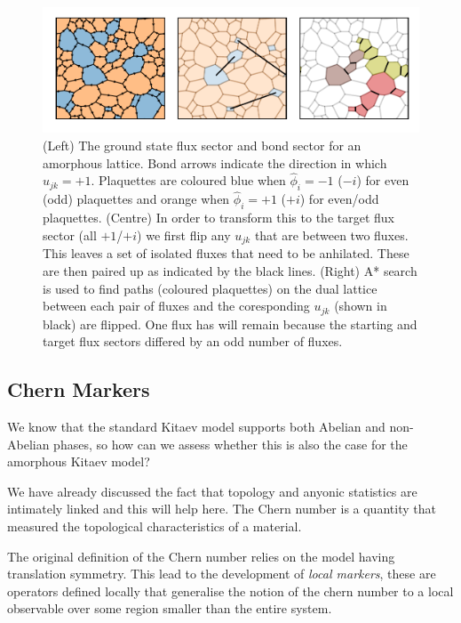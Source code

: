 \begin{figure}
\hypertarget{fig:flux_finding}{%
\centering
\includegraphics[width=1\textwidth,height=\textheight]{figure_code/amk_chapter/flux_finding/flux_finding.pdf}
\caption{(Left) The ground state flux sector and bond sector for an
amorphous lattice. Bond arrows indicate the direction in which
\(u_{jk} = +1\). Plaquettes are coloured blue when \(\hat{\phi}_i = -1\)
(\(-i\)) for even (odd) plaquettes and orange when \(\hat{\phi}_i = +1\)
(\(+i\)) for even/odd plaquettes. (Centre) In order to transform this to
the target flux sector (all \(+1\)/\(+i\)) we first flip any \(u_{jk}\)
that are between two fluxes. This leaves a set of isolated fluxes that
need to be anhilated. These are then paired up as indicated by the black
lines. (Right) A* search is used to find paths (coloured plaquettes) on
the dual lattice between each pair of fluxes and the coresponding
\(u_{jk}\) (shown in black) are flipped. One flux has will remain
because the starting and target flux sectors differed by an odd number
of fluxes.}\label{fig:flux_finding}
}
\end{figure}

\hypertarget{chern-markers}{%
\subsection{Chern Markers}\label{chern-markers}}

We know that the standard Kitaev model supports both Abelian and
non-Abelian phases, so how can we assess whether this is also the case
for the amorphous Kitaev model?

We have already discussed the fact that topology and anyonic statistics
are intimately linked and this will help here. The Chern number is a
quantity that measured the topological characteristics of a material.

The original definition of the Chern number relies on the model having
translation symmetry. This lead to the development of \emph{local
markers}, these are operators defined locally that generalise the notion
of the chern number to a local observable over some region smaller than
the entire system.
